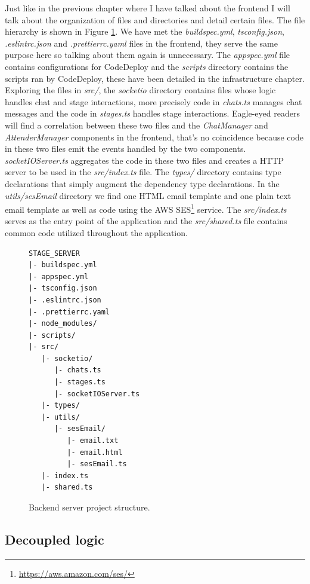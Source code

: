 Just like in the previous chapter where I have talked about the frontend I will talk about the organization of files and directories and detail certain files. The file hierarchy is shown in Figure \ref{figure:backend-stage-server-project-structure}. We have met the \textit{buildspec.yml}, \textit{tsconfig.json}, \textit{.eslintrc.json} and \textit{.prettierrc.yaml} files in the frontend, they serve the same purpose here so talking about them again is unnecessary. The \textit{appspec.yml} file contains configurations for CodeDeploy and the \textit{scripts} directory contains the scripts ran by CodeDeploy, these have been detailed in the infrastructure chapter. Exploring the files in \textit{src/}, the \textit{socketio} directory contains files whose logic handles chat and stage interactions, more precisely code in \textit{chats.ts} manages chat messages and the code in \textit{stages.ts} handles stage interactions. Eagle-eyed readers will find a correlation between these two files and the \textit{ChatManager} and \textit{AttenderManager} components in the frontend, that's no coincidence because code in these two files emit the events handled by the two components. \textit{socketIOServer.ts} aggregates the code in these two files and creates a HTTP server to be used in the \textit{src/index.ts} file. The \textit{types/} directory contains type declarations that simply augment the dependency type declarations. In the \textit{utils/sesEmail} directory we find one HTML email template and one plain text email template as well as code using the AWS SES\footnote{\href{https://aws.amazon.com/ses/}{https://aws.amazon.com/ses/}} service. The \textit{src/index.ts} serves as the entry point of the application and the \textit{src/shared.ts} file contains common code utilized throughout the application.

\begin{figure}[H]
\begin{verbatim}
STAGE_SERVER
|- buildspec.yml
|- appspec.yml
|- tsconfig.json
|- .eslintrc.json
|- .prettierrc.yaml
|- node_modules/
|- scripts/
|- src/
   |- socketio/
      |- chats.ts
      |- stages.ts
      |- socketIOServer.ts
   |- types/
   |- utils/
   	  |- sesEmail/
   	     |- email.txt
   	     |- email.html
   	     |- sesEmail.ts   
   |- index.ts
   |- shared.ts  
\end{verbatim}
\caption{Backend server project structure.}
\label{figure:backend-stage-server-project-structure}
\end{figure}

\subsection{Decoupled logic}

